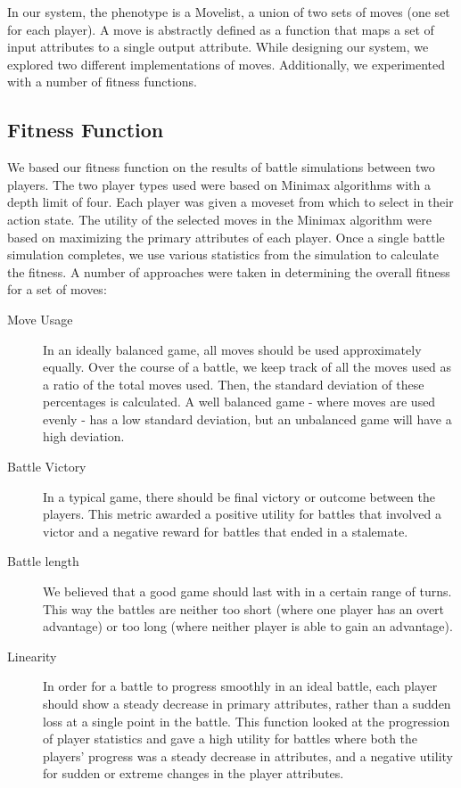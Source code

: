\documentclass{acm_proc_article-sp}
\begin{document}
In our system, the phenotype is a Movelist, a union of two sets of moves (one set for each player). A move is abstractly defined as a function that maps a set of input attributes to a single output attribute. While designing our system, we explored two different implementations of moves. Additionally, we experimented with a number of fitness functions.

\subsection{Fitness Function}

We based our fitness function on the results of battle simulations between two players.  The two player types used were based on Minimax algorithms with a depth limit of four. Each player was given a moveset from which to select in their action state. The utility of the selected moves in the Minimax algorithm were based on maximizing the primary attributes of each player.
Once a single battle simulation completes, we use various statistics from the simulation to calculate the fitness. A number of approaches were taken in determining the overall fitness for a set of moves:

\begin{description}
    \item[Move Usage] In an ideally balanced game, all moves should be used approximately equally. Over the course of a battle, we keep track of all the moves used as a ratio of the total moves used. Then, the standard deviation of these percentages is calculated. A well balanced game - where moves are used evenly - has a low standard deviation, but an unbalanced game will have a high deviation.
    \item[Battle Victory] In a typical game, there should be final victory or outcome between the players. This metric awarded a positive utility for battles that involved a victor and a negative reward for battles that ended in a stalemate.
    \item[Battle length] We believed that a good game should last with in a certain range of turns. This way the battles are neither too short (where one player has an overt advantage) or too long (where neither player is able to gain an advantage). 
    \item[Linearity] In order for a battle to progress smoothly in an ideal battle, each player should show a steady decrease in primary attributes, rather than a sudden loss at a single point in the battle. This function looked at the progression of player statistics and gave a high utility for battles where both the players’ progress was a steady decrease in attributes, and a negative utility for sudden or extreme changes in the player attributes.
\end{description}
\end{document}
